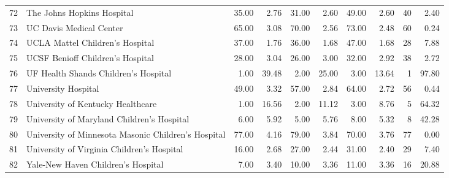 \begin{table}[ht]
\begin{tabular}{rlrrrrrrrr}
  72 & The Johns Hopkins Hospital & 35.00 & 2.76 & 31.00 & 2.60 & 49.00 & 2.60 &  40 & 2.40 \\ 
  73 & UC Davis Medical Center & 65.00 & 3.08 & 70.00 & 2.56 & 73.00 & 2.48 &  60 & 0.24 \\ 
  74 & UCLA Mattel Children's Hospital & 37.00 & 1.76 & 36.00 & 1.68 & 47.00 & 1.68 &  28 & 7.88 \\ 
  75 & UCSF Benioff Children's Hospital & 28.00 & 3.04 & 26.00 & 3.00 & 32.00 & 2.92 &  38 & 2.72 \\ 
  76 & UF Health Shands Children's Hospital & 1.00 & 39.48 & 2.00 & 25.00 & 3.00 & 13.64 &   1 & 97.80 \\ 
  77 & University Hospital & 49.00 & 3.32 & 57.00 & 2.84 & 64.00 & 2.72 &  56 & 0.44 \\ 
  78 & University of Kentucky Healthcare & 1.00 & 16.56 & 2.00 & 11.12 & 3.00 & 8.76 &   5 & 64.32 \\ 
  79 & University of Maryland Children's Hospital & 6.00 & 5.92 & 5.00 & 5.76 & 8.00 & 5.32 &   8 & 42.28 \\ 
  80 & University of Minnesota Masonic Children's Hospital & 77.00 & 4.16 & 79.00 & 3.84 & 70.00 & 3.76 &  77 & 0.00 \\ 
  81 & University of Virginia Children's Hospital & 16.00 & 2.68 & 27.00 & 2.44 & 31.00 & 2.40 &  29 & 7.40 \\ 
  82 & Yale-New Haven Children's Hospital & 7.00 & 3.40 & 10.00 & 3.36 & 11.00 & 3.36 &  16 & 20.88 \\ 
   \hline
\end{tabular}
\end{table}
